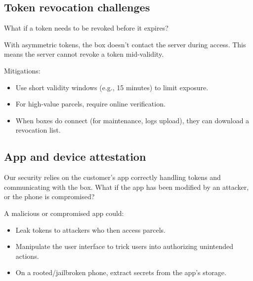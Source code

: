 \subsection{Token revocation challenges}

\begin{exercise}
  What if a token needs to be revoked before it expires?
\end{exercise}

With asymmetric tokens, the box doesn't contact the server during access.
This means the server cannot revoke a token mid-validity.

Mitigations:
\begin{itemize}
  \item Use short validity windows (e.g., 15 minutes) to limit exposure.
  \item For high-value parcels, require online verification.
  \item When boxes do connect (for maintenance, logs upload), they can
    download a revocation list.
\end{itemize}

\subsection{App and device attestation}


\begin{exercise}
  Our security relies on the customer's app correctly handling tokens and 
  communicating with the box.
  What if the app has been modified by an attacker, or the phone is 
  compromised?
\end{exercise}

A malicious or compromised app could:
\begin{itemize}
  \item Leak tokens to attackers who then access parcels.
  \item Manipulate the user interface to trick users into authorizing 
    unintended actions.
  \item On a rooted/jailbroken phone, extract secrets from the app's storage.
\end{itemize}

